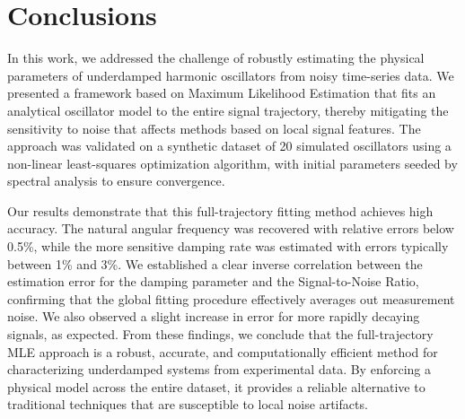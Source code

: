 \documentclass[]{article}
\begin{document}
\section{Conclusions}
\label{sec:conclusions}
In this work, we addressed the challenge of robustly estimating the physical parameters of underdamped harmonic oscillators from noisy time-series data. We presented a framework based on Maximum Likelihood Estimation that fits an analytical oscillator model to the entire signal trajectory, thereby mitigating the sensitivity to noise that affects methods based on local signal features. The approach was validated on a synthetic dataset of 20 simulated oscillators using a non-linear least-squares optimization algorithm, with initial parameters seeded by spectral analysis to ensure convergence.

Our results demonstrate that this full-trajectory fitting method achieves high accuracy. The natural angular frequency was recovered with relative errors below 0.5\%, while the more sensitive damping rate was estimated with errors typically between 1\% and 3\%. We established a clear inverse correlation between the estimation error for the damping parameter and the Signal-to-Noise Ratio, confirming that the global fitting procedure effectively averages out measurement noise. We also observed a slight increase in error for more rapidly decaying signals, as expected. From these findings, we conclude that the full-trajectory MLE approach is a robust, accurate, and computationally efficient method for characterizing underdamped systems from experimental data. By enforcing a physical model across the entire dataset, it provides a reliable alternative to traditional techniques that are susceptible to local noise artifacts.


{}

\end{document}
